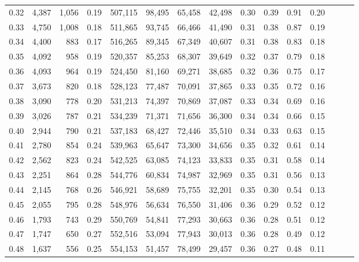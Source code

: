 \begin{tabular}{rrrrrrrrrrrrrrr}
0.32 &   4,387 &  1,056 &  0.19 &  507,115 &   98,495 &   65,458 &   42,498 &  0.30 &  0.39 &  0.91 &      0.20 \\
0.33 &   4,750 &  1,008 &  0.18 &  511,865 &   93,745 &   66,466 &   41,490 &  0.31 &  0.38 &  0.87 &      0.19 \\
0.34 &   4,400 &    883 &  0.17 &  516,265 &   89,345 &   67,349 &   40,607 &  0.31 &  0.38 &  0.83 &      0.18 \\
0.35 &   4,092 &    958 &  0.19 &  520,357 &   85,253 &   68,307 &   39,649 &  0.32 &  0.37 &  0.79 &      0.18 \\
0.36 &   4,093 &    964 &  0.19 &  524,450 &   81,160 &   69,271 &   38,685 &  0.32 &  0.36 &  0.75 &      0.17 \\
0.37 &   3,673 &    820 &  0.18 &  528,123 &   77,487 &   70,091 &   37,865 &  0.33 &  0.35 &  0.72 &      0.16 \\
0.38 &   3,090 &    778 &  0.20 &  531,213 &   74,397 &   70,869 &   37,087 &  0.33 &  0.34 &  0.69 &      0.16 \\
0.39 &   3,026 &    787 &  0.21 &  534,239 &   71,371 &   71,656 &   36,300 &  0.34 &  0.34 &  0.66 &      0.15 \\
0.40 &   2,944 &    790 &  0.21 &  537,183 &   68,427 &   72,446 &   35,510 &  0.34 &  0.33 &  0.63 &      0.15 \\
0.41 &   2,780 &    854 &  0.24 &  539,963 &   65,647 &   73,300 &   34,656 &  0.35 &  0.32 &  0.61 &      0.14 \\
0.42 &   2,562 &    823 &  0.24 &  542,525 &   63,085 &   74,123 &   33,833 &  0.35 &  0.31 &  0.58 &      0.14 \\
0.43 &   2,251 &    864 &  0.28 &  544,776 &   60,834 &   74,987 &   32,969 &  0.35 &  0.31 &  0.56 &      0.13 \\
0.44 &   2,145 &    768 &  0.26 &  546,921 &   58,689 &   75,755 &   32,201 &  0.35 &  0.30 &  0.54 &      0.13 \\
0.45 &   2,055 &    795 &  0.28 &  548,976 &   56,634 &   76,550 &   31,406 &  0.36 &  0.29 &  0.52 &      0.12 \\
0.46 &   1,793 &    743 &  0.29 &  550,769 &   54,841 &   77,293 &   30,663 &  0.36 &  0.28 &  0.51 &      0.12 \\
0.47 &   1,747 &    650 &  0.27 &  552,516 &   53,094 &   77,943 &   30,013 &  0.36 &  0.28 &  0.49 &      0.12 \\
0.48 &   1,637 &    556 &  0.25 &  554,153 &   51,457 &   78,499 &   29,457 &  0.36 &  0.27 &  0.48 &      0.11 \\

\end{tabular}
